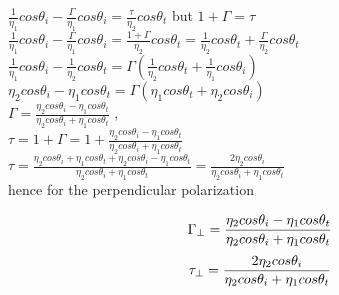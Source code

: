 \begin{center}
$\frac{1}{\eta_{1}}cos\theta_{i} - \frac{\Gamma}{\eta_{1}}cos\theta_{i} = \frac{\tau}{\eta_{2}}cos\theta_{t}$ but $1 + \Gamma = \tau$\newline
\\
$\frac{1}{\eta_{1}}cos\theta_{i} - \frac{\Gamma}{\eta_{1}}cos\theta_{i} = \frac{1+\Gamma}{\eta_{2}}cos\theta_{t} = \frac{1}{\eta_{2}}cos\theta_{t} + \frac{\Gamma}{\eta_{2}}cos\theta_{t}$\newline
\\
$\frac{1}{\eta_{1}}cos\theta_{i} - \frac{1}{\eta_{2}}cos\theta_{t} = \Gamma( \frac{1}{\eta_{2}}cos\theta_{t} + \frac{1}{\eta_{1}}cos\theta_{i})$\newline
\\
$\eta_{2}cos\theta_{i} - \eta_{1}cos\theta_{t} = \Gamma(\eta_{1}cos\theta_{t} + \eta_{2}cos\theta_{i})$\newline
\\
$\Gamma = \frac{\eta_{2}cos\theta_{i} - \eta_{1}cos\theta_{t}}{\eta_{2}cos\theta_{i} + \eta_{1}cos\theta_{t}}$ ,\newline
\\
 $\tau = 1 + \Gamma = 1 + \frac{\eta_{2}cos\theta_{i} - \eta_{1}cos\theta_{t}}{\eta_{2}cos\theta_{i} + \eta_{1}cos\theta_{t}}$\newline
 \\
 $\tau = \frac{\eta_{2}cos\theta_{i} + \eta_{1}cos\theta_{t} + \eta_{2}cos\theta_{i} - \eta_{1}cos\theta_{t}}{\eta_{2}cos\theta_{i} + \eta_{1}cos\theta_{t}} = \frac{2 \eta_{2}cos\theta_{i}}{\eta_{2}cos\theta_{i} + \eta_{1}cos\theta_{t}}$\newline
 \\
 hence for the perpendicular polarization

\end{center}
\begin{equation}
\centering
\Gamma_{\perp} = \frac{\eta_{2}cos\theta_{i} - \eta_{1}cos\theta_{t}}{\eta_{2}cos\theta_{i} + \eta_{1}cos\theta_{t}}
\end{equation}
\begin{equation}
\centering
\tau_{\perp} = \frac{2 \eta_{2}cos\theta_{i}}{\eta_{2}cos\theta_{i} + \eta_{1}cos\theta_{t}}
\end{equation}

